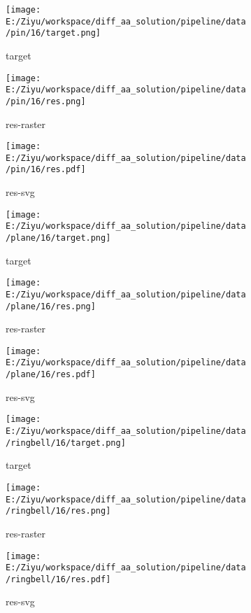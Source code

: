 \documentclass{article}%
\begin{document}
%


\begin{figure}[H]%
\begin{subfigure}[b]{0.32\linewidth}%
\texttt{[image: E:/Ziyu/workspace/diff\_aa\_solution/pipeline/data/pin/16/target.png]}%
\caption{target}%
\end{subfigure}%
\begin{subfigure}[b]{0.32\linewidth}%
\texttt{[image: E:/Ziyu/workspace/diff\_aa\_solution/pipeline/data/pin/16/res.png]}%
\caption{res{-}raster}%
\end{subfigure}%
\begin{subfigure}[b]{0.32\linewidth}%
\texttt{[image: E:/Ziyu/workspace/diff\_aa\_solution/pipeline/data/pin/16/res.pdf]}%
\caption{res{-}svg}%
\end{subfigure}%
\par\vspace{1em}%
\caption{}%
\clearpage%
\end{figure}

%


\begin{figure}[H]%
\begin{subfigure}[b]{0.32\linewidth}%
\texttt{[image: E:/Ziyu/workspace/diff\_aa\_solution/pipeline/data/plane/16/target.png]}%
\caption{target}%
\end{subfigure}%
\begin{subfigure}[b]{0.32\linewidth}%
\texttt{[image: E:/Ziyu/workspace/diff\_aa\_solution/pipeline/data/plane/16/res.png]}%
\caption{res{-}raster}%
\end{subfigure}%
\begin{subfigure}[b]{0.32\linewidth}%
\texttt{[image: E:/Ziyu/workspace/diff\_aa\_solution/pipeline/data/plane/16/res.pdf]}%
\caption{res{-}svg}%
\end{subfigure}%
\par\vspace{1em}%
\caption{}%
\end{figure}

%


\begin{figure}[H]%
\begin{subfigure}[b]{0.32\linewidth}%
\texttt{[image: E:/Ziyu/workspace/diff\_aa\_solution/pipeline/data/ringbell/16/target.png]}%
\caption{target}%
\end{subfigure}%
\begin{subfigure}[b]{0.32\linewidth}%
\texttt{[image: E:/Ziyu/workspace/diff\_aa\_solution/pipeline/data/ringbell/16/res.png]}%
\caption{res{-}raster}%
\end{subfigure}%
\begin{subfigure}[b]{0.32\linewidth}%
\texttt{[image: E:/Ziyu/workspace/diff\_aa\_solution/pipeline/data/ringbell/16/res.pdf]}%
\caption{res{-}svg}%
\end{subfigure}%
\par\vspace{1em}%
\caption{}%
\end{figure}
\end{document}
